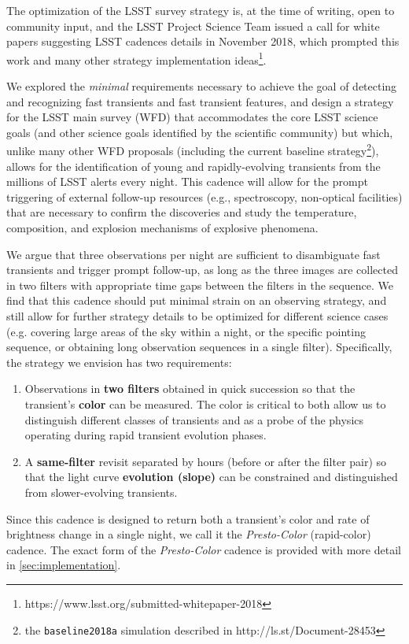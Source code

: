 \documentclass[letterpaper,longauthor,trackchanges,twocolumn,onecolappendix,sort&compress]{aastex62}
\begin{document}
The optimization of the LSST survey strategy is, at the time of writing, open to community input, and the LSST Project Science Team issued a call for white papers suggesting LSST cadences details in November 2018, which prompted this work and many other strategy implementation ideas\footnote{https://www.lsst.org/submitted-whitepaper-2018}. 

We explored the \emph{minimal} requirements necessary to achieve the goal of detecting and recognizing fast transients and fast transient features, and design a strategy for the LSST main survey (WFD) that accommodates the core LSST science goals (and other science goals identified by the scientific community) but which, unlike many other WFD proposals (including the current baseline strategy\footnote{the {\tt baseline2018a} simulation described in http://ls.st/Document-28453}), allows for the identification of young and rapidly-evolving transients from the millions of LSST alerts every night. This cadence will allow for the prompt triggering of external follow-up resources (e.g., spectroscopy, non-optical facilities) that are necessary to confirm the discoveries and study the temperature, composition, and explosion mechanisms of explosive phenomena.

We argue that three observations per night are sufficient to disambiguate fast transients and trigger prompt follow-up, as long as the three images are collected in two filters with appropriate time gaps between the filters in the sequence. We find that this cadence should put minimal strain on an observing strategy, and still allow for further strategy details to be optimized for different science cases (e.g. covering large areas of the sky within a night, or the specific pointing sequence, or obtaining long observation sequences in a single filter). Specifically, the strategy we envision has two requirements: 
\begin{enumerate}
    \item Observations in {\bf two filters} obtained in quick succession so that the transient's {\bf color} can be measured. The color is critical to both allow us to distinguish different classes of transients and as a probe of the physics operating during rapid transient evolution phases.
    \item A {\bf same-filter} revisit separated by hours (before or after the filter pair) so that the light curve {\bf evolution (slope)} can be constrained and distinguished from slower-evolving transients.
\end{enumerate}
Since this cadence is designed to return both a transient's color and rate of brightness change in a single night, we call it the {\em Presto-Color} (rapid-color) cadence. 
The exact form of the {\em Presto-Color} cadence is provided with more detail in \autoref{sec:implementation}.
\end{document}

